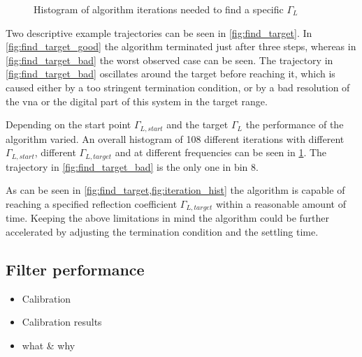 \documentclass[12pt,a4paper,parskip=full,abstract=true,BCOR=10mm,twoside,open=right]{scrreprt}
\begin{document}
\begin{figure}[htb]
    \centering
    \caption{Histogram of algorithm iterations needed to find a specific $\Gamma_L$}
    \label{fig:iteration_hist}
\end{figure}

Two descriptive example trajectories can be seen in \cref{fig:find_target}. In
\cref{fig:find_target_good} the algorithm terminated just after three steps,
whereas in \cref{fig:find_target_bad} the worst observed case can be seen. The
trajectory in \cref{fig:find_target_bad} oscillates around the target before
reaching it, which is caused either by a too stringent termination condition, or
by a bad resolution of the \gls{vna} or the digital part of this system in the
target range.

Depending on the start point $\Gamma_{L,start}$ and the target $\Gamma_{L}$
the performance of the algorithm varied. An overall histogram of 108 different
iterations with different $\Gamma_{L,start}$, different $\Gamma_{L,target}$ and
at different frequencies can be seen in \cref{fig:iteration_hist}. The trajectory
in \cref{fig:find_target_bad} is the only one in bin 8.

As can be seen in \cref{fig:find_target,fig:iteration_hist} the algorithm is capable
of reaching a specified reflection coefficient $\Gamma_{L,target}$ within a reasonable
amount of time. Keeping the above limitations in mind the algorithm could be further
accelerated by adjusting the termination condition and the settling time.

\subsection{Filter performance}
\label{sec:filter}

\begin{itemize}
    \item Calibration
    \item Calibration results
    \item what \& why
\end{itemize}
\end{document}
